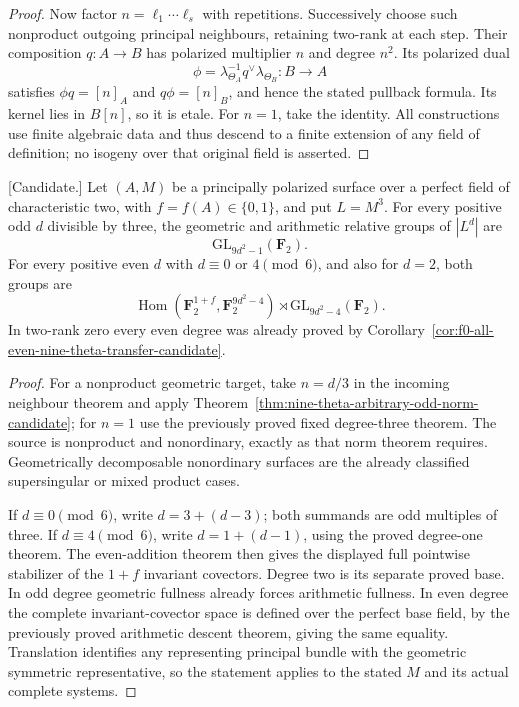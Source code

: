 \begin{proof}
Now factor $n=\ell_1\cdots\ell_s$ with repetitions. Successively
choose such nonproduct outgoing principal neighbours, retaining
two-rank at each step. Their composition $q:A\to B$ has polarized
multiplier $n$ and degree $n^2$. Its polarized dual
\[
           \phi=\lambda_{\Theta_A}^{-1}q^\vee\lambda_{\Theta_B}
                     :B\longrightarrow A
\]
satisfies $\phi q=[n]_A$ and $q\phi=[n]_B$, and hence the stated
pullback formula. Its kernel lies in $B[n]$, so it is etale.
For $n=1$, take the identity. All constructions use finite algebraic
data and thus descend to a finite extension of any field of
definition; no isogeny over that original field is asserted.
\end{proof}

\begin{corollary}
\label{cor:nonordinary-all-odd-multiples-three-candidate}
\textup{[Candidate.]}
Let $(A,M)$ be a principally polarized surface over a perfect field
of characteristic two, with $f=f(A)\in\{0,1\}$, and put $L=M^3$.
For every positive odd $d$ divisible by three, the geometric and
arithmetic relative groups of $|L^d|$ are
\[
                         \mathrm{GL}_{9d^2-1}(\mathbf F_2).
\]
For every positive even $d$ with $d\equiv0$ or $4\pmod6$, and also
for $d=2$, both groups are
\[
 \operatorname{Hom}(\mathbf F_2^{1+f},\mathbf F_2^{9d^2-4})
                  \rtimes\mathrm{GL}_{9d^2-4}(\mathbf F_2).
\]
In two-rank zero every even degree was already proved by
Corollary~\ref{cor:f0-all-even-nine-theta-transfer-candidate}.
\end{corollary}

\begin{proof}
For a nonproduct geometric target, take $n=d/3$ in the incoming
neighbour theorem and apply
Theorem~\ref{thm:nine-theta-arbitrary-odd-norm-candidate}; for $n=1$
use the previously proved fixed degree-three theorem. The source
is nonproduct and nonordinary, exactly as that norm theorem requires.
Geometrically decomposable nonordinary surfaces are the already
classified supersingular or mixed product cases.

If $d\equiv0\pmod6$, write $d=3+(d-3)$; both summands are odd
multiples of three. If $d\equiv4\pmod6$, write $d=1+(d-1)$,
using the proved degree-one theorem. The even-addition theorem
then gives the displayed full pointwise stabilizer of the
$1+f$ invariant covectors. Degree two is its separate proved base.
In odd degree geometric fullness already forces arithmetic
fullness. In even degree the complete invariant-covector space
is defined over the perfect base field, by the previously proved
arithmetic descent theorem, giving the same equality. Translation
identifies any representing principal bundle with the geometric
symmetric representative, so the statement applies to the stated
$M$ and its actual complete systems.
\end{proof}

